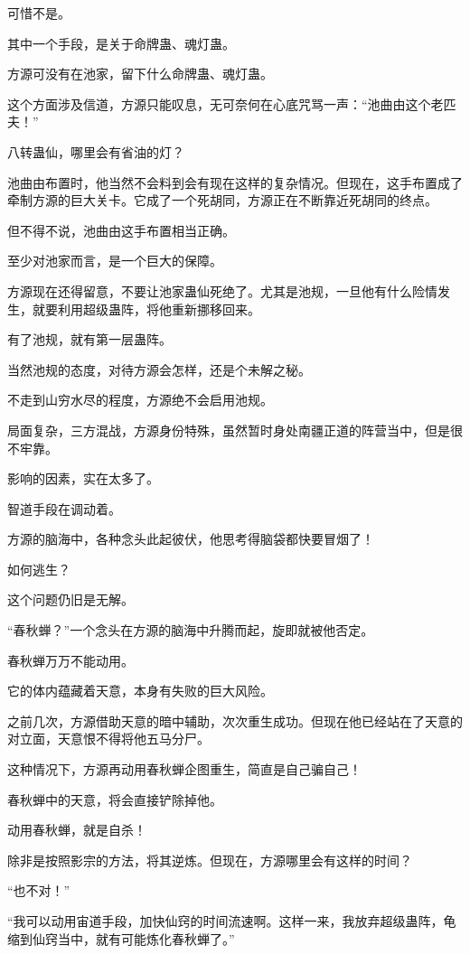 \begin{this_body}
可惜不是。

其中一个手段，是关于命牌蛊、魂灯蛊。

方源可没有在池家，留下什么命牌蛊、魂灯蛊。

这个方面涉及信道，方源只能叹息，无可奈何在心底咒骂一声：“池曲由这个老匹夫！”

八转蛊仙，哪里会有省油的灯？

池曲由布置时，他当然不会料到会有现在这样的复杂情况。但现在，这手布置成了牵制方源的巨大关卡。它成了一个死胡同，方源正在不断靠近死胡同的终点。

但不得不说，池曲由这手布置相当正确。

至少对池家而言，是一个巨大的保障。

方源现在还得留意，不要让池家蛊仙死绝了。尤其是池规，一旦他有什么险情发生，就要利用超级蛊阵，将他重新挪移回来。

有了池规，就有第一层蛊阵。

当然池规的态度，对待方源会怎样，还是个未解之秘。

不走到山穷水尽的程度，方源绝不会启用池规。

局面复杂，三方混战，方源身份特殊，虽然暂时身处南疆正道的阵营当中，但是很不牢靠。

影响的因素，实在太多了。

智道手段在调动着。

方源的脑海中，各种念头此起彼伏，他思考得脑袋都快要冒烟了！

如何逃生？

这个问题仍旧是无解。

“春秋蝉？”一个念头在方源的脑海中升腾而起，旋即就被他否定。

春秋蝉万万不能动用。

它的体内蕴藏着天意，本身有失败的巨大风险。

之前几次，方源借助天意的暗中辅助，次次重生成功。但现在他已经站在了天意的对立面，天意恨不得将他五马分尸。

这种情况下，方源再动用春秋蝉企图重生，简直是自己骗自己！

春秋蝉中的天意，将会直接铲除掉他。

动用春秋蝉，就是自杀！

除非是按照影宗的方法，将其逆炼。但现在，方源哪里会有这样的时间？

“也不对！”

“我可以动用宙道手段，加快仙窍的时间流速啊。这样一来，我放弃超级蛊阵，龟缩到仙窍当中，就有可能炼化春秋蝉了。”


\end{this_body}
